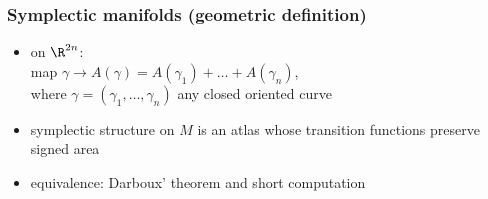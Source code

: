 \begin{frame}
  \frametitle{Symplectic manifolds (geometric definition)}
  \begin{itemize}
    \item {} on $\R^{2n}$:\\
    map $\gamma\to A(\gamma)=A(\gamma_1)+\dots+A(\gamma_n)$,\\
    where $\gamma=(\gamma_1,\dots,\gamma_n)$ any closed oriented curve
    \item symplectic structure on $M$ is an atlas whose transition functions preserve signed area
    \item equivalence: Darboux' theorem and short computation
  \end{itemize}
\end{frame}
